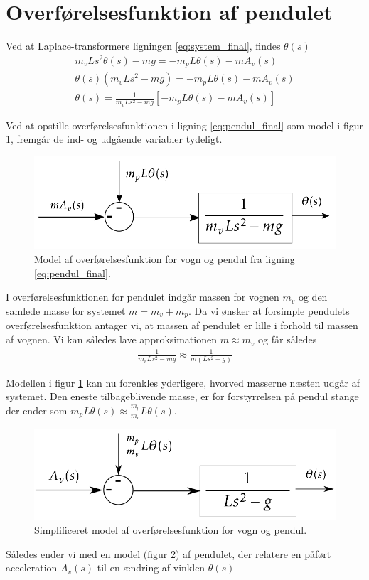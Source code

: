 \section{Overførelsesfunktion af pendulet}\label{sec:sec_penduloverforelse}
Ved at Laplace-transformere ligningen \ref{eq:system_final}, findes $\theta(s)$
\begin{align}
 m_vLs^2\theta(s) - mg = -m_pL\theta(s) -mA_v(s) \\
 \theta(s)\left(m_vLs^2 - mg \right) = -m_pL\theta(s) -mA_v(s) \\
 \theta(s) = \frac{1}{m_vLs^2 - mg }\left[-m_pL\theta(s) -mA_v(s)\right] \label{eq:pendul_final}
\end{align} 
 
Ved at opstille overførelsesfunktionen i ligning \ref{eq:pendul_final} som model i figur \ref{fig:pendul_trans1}, fremgår de ind- og udgående variabler tydeligt. 

\begin{figure}[h!]
	\centering
	\includegraphics[width=.6\textwidth]{billeder/pendul_trans1.png}
	\caption[Model af overførelsesfunktion for vogn og pendul.]{Model af overførelsesfunktion for vogn og pendul fra ligning \ref{eq:pendul_final}.}
	\label{fig:pendul_trans1}
\end{figure}
\FloatBlock

I overførelsesfunktionen for pendulet indgår massen for vognen $m_v$ og den samlede masse for systemet $m = m_v + m_p$.
Da vi ønsker at forsimple pendulets overførelsesfunktion antager vi, at massen af pendulet er lille i forhold til massen af vognen. 
Vi kan således lave approksimationen $m \approx m_v$ og får således
\begin{align}
\frac{1}{m_vLs^2 - mg } \approx  \frac{1}{m \left( Ls^2 - g \right) }
\end{align}     

Modellen i figur \ref{fig:pendul_trans1} kan nu forenkles yderligere, hvorved masserne næsten udgår af systemet.
Den eneste tilbageblivende masse, er for forstyrrelsen på pendul stange der ender som $m_pL\theta(s) \approx  \frac{m_p}{m_v}L\theta(s) $.

\begin{figure}[h!]
	\centering
	\includegraphics[width=.6\textwidth]{billeder/pendul_trans_clean.png}
	\caption{Simplificeret model af overførelsesfunktion for vogn og pendul.}
	\label{fig:pendul_trans_clean}
\end{figure}
\FloatBlock 
Således ender vi med en model (figur \ref{fig:pendul_trans_clean}) af pendulet, der relatere en påført acceleration $A_v(s)$ til en ændring af vinklen $\theta(s)$

